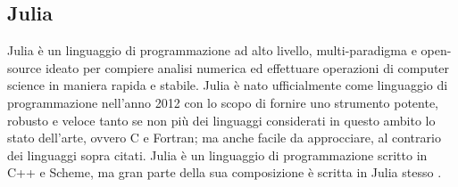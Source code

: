 \subsection{Julia}


Julia è un linguaggio di programmazione ad alto livello, 
multi-paradigma e open-source ideato per compiere analisi 
numerica ed effettuare operazioni di computer science in 
maniera rapida e stabile. Julia è nato ufficialmente come 
linguaggio di programmazione nell’anno 2012 con lo scopo di 
fornire uno strumento potente, robusto e veloce tanto se non 
più dei linguaggi considerati in questo ambito lo stato 
dell’arte, ovvero C e Fortran;  ma anche facile da approcciare, 
al contrario dei linguaggi sopra citati. Julia è un linguaggio 
di programmazione scritto in C++ e Scheme, ma gran parte della 
sua composizione è scritta in Julia stesso 
\cite{wiki:Julia_(programming_language)}.

